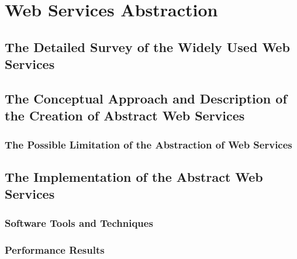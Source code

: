 \chapter{Web Services Abstraction}

\section{The Detailed Survey of the Widely Used Web Services}

\section{The Conceptual Approach and Description of the Creation of Abstract Web Services}

\subsection{The Possible Limitation of the Abstraction of Web Services}

\section{The Implementation of the Abstract Web Services}

\subsection{Software Tools and Techniques}

\subsection{Performance Results}